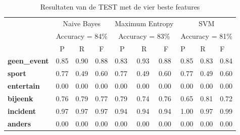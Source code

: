 {{\begin{table}[H]
\centering
\caption{Resultaten van de TEST met de vier beste features}\label{testclassifiers}
\vspace*{-5pt}
\begin{tabular}{l|l|l|l|l|l|l|l|l|l|}
\cline{2-10}
& \multicolumn{3}{c|}{Naive Bayes}                                         & \multicolumn{3}{c|}{Maximum Entropy}                                     & \multicolumn{3}{c|}{SVM}             \\ \cline{2-10} 
& \multicolumn{3}{c|}{Accuracy = 84\%}                                     & \multicolumn{3}{c|}{Accuracy = 83\%}                                     & \multicolumn{3}{c|}{Accuracy = 81\%} \\ \cline{2-10} 
& \multicolumn{1}{c|}{P} & \multicolumn{1}{c|}{R} & \multicolumn{1}{c|}{F} & \multicolumn{1}{c|}{P} & \multicolumn{1}{c|}{R} & \multicolumn{1}{c|}{F} & P          & R          & F          \\ \hline
\multicolumn{1}{|l|}{\bf{geen\_event}} & 0.85                   & 0.90                   & 0.88                   & 0.83                   & 0.93                   & 0.88                   & 0.85       & 0.83       & 0.84       \\ \hline
\multicolumn{1}{|l|}{\bf{sport}} & 0.77                   & 0.49                   & 0.60                   & 0.77                   & 0.49                   & 0.60                   & 0.77       & 0.49       & 0.60       \\ \hline
\multicolumn{1}{|l|}{\bf{entertain}} & 0.00                   & 0.00                   & 0.00                   & 0.00                   & 0.00                   & 0.00                   & 0.00       & 0.00       & 0.00       \\ \hline
\multicolumn{1}{|l|}{\bf{bijeenk}} & 0.76                   & 0.79                   & 0.77                   & 0.79                   & 0.74                   & 0.76                   & 0.65       & 0.81       & 0.72       \\ \hline
\multicolumn{1}{|l|}{\bf{incident}} & 0.97                   & 0.97                   & 0.97                   & 0.94                   & 0.94                   & 0.94                   & 1.00       & 0.97       & 0.99       \\ \hline
\multicolumn{1}{|l|}{\bf{anders}} & 0.00                   & 0.00                   & 0.00                   & 0.00                   & 0.00                   & 0.00                   & 0.00       & 0.00       & 0.00       \\ \hline
\end{tabular}
\end{table}

}}
